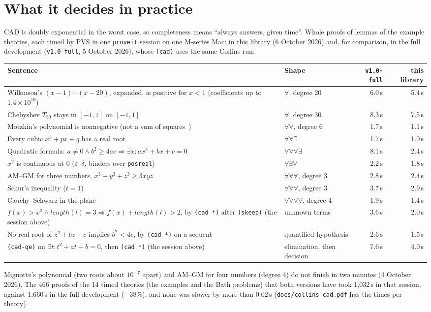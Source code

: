\documentclass[11pt]{article}
\begin{document}
\section{What it decides in practice}
CAD is doubly exponential in the worst case, so completeness means ``always answers, given time''. Whole proofs of
lemmas of the example theories, each timed by PVS in one \texttt{proveit} session on one M-series Mac: in this library
(6 October 2026) and, for comparison, in the full development (\texttt{v1.0-full}, 5 October 2026), whose
\texttt{(cad)} uses the same Collins run:
\begin{center}\small
\begin{tabularx}{\textwidth}{@{}X l r r@{}}
\toprule
Sentence & Shape & \texttt{v1.0-full} & this library\\
\midrule
Wilkinson's $(x-1)\cdots(x-20)$, expanded, is positive for $x<1$ (coefficients up to $1.4\times10^{19}$) & $\forall$, degree 20 & 6.0\,s & 5.4\,s\\
Chebyshev $T_{30}$ stays in $[-1,1]$ on $[-1,1]$ & $\forall$, degree 30 & 8.3\,s & 7.5\,s\\
Motzkin's polynomial is nonnegative (not a sum of squares~\cite{motzkin}) & $\forall\forall$, degree 6 & 1.7\,s & 1.1\,s\\
Every cubic $x^3+px+q$ has a real root & $\forall\forall\exists$ & 1.7\,s & 1.0\,s\\
Quadratic formula: $a\neq0 \wedge b^2\ge 4ac \Rightarrow \exists x\colon ax^2+bx+c=0$ & $\forall\forall\forall\exists$ & 8.1\,s & 2.4\,s\\
$x^2$ is continuous at 0 ($\varepsilon$--$\delta$, binders over \texttt{posreal}) & $\forall\exists\forall$ & 2.2\,s & 1.8\,s\\
AM--GM for three numbers, $x^3+y^3+z^3\ge 3xyz$ & $\forall\forall\forall$, degree 3 & 2.8\,s & 2.4\,s\\
Schur's inequality ($t=1$) & $\forall\forall\forall$, degree 3 & 3.7\,s & 2.9\,s\\
Cauchy--Schwarz in the plane & $\forall\forall\forall\forall$, degree 4 & 1.9\,s & 1.4\,s\\
$f(x) > x^2 \wedge \mathit{length}(l) = 3 \Rightarrow f(x) + \mathit{length}(l) > 2$, by \texttt{(cad *)} after \texttt{(skeep)} (the session above) & unknown terms & 3.6\,s & 2.0\,s\\
No real root of $z^2+bz+c$ implies $b^2<4c$, by \texttt{(cad *)} on a sequent & quantified hypothesis & 2.6\,s & 1.5\,s\\
\texttt{(cad-qe)} on $\exists t\colon t^2+at+b=0$, then \texttt{(cad *)} (the session above) & elimination, then decision & 7.6\,s & 4.0\,s\\
\bottomrule
\end{tabularx}
\end{center}
Mignotte's polynomial (two roots about $10^{-7}$ apart) and AM--GM for four numbers (degree 4) do not finish in two
minutes (4 October 2026). The 466 proofs of the 14 timed theories (the examples and the Bath problems) that both versions have took 1,032\,s in that
session, against 1,660\,s in the full development ($-38\%$), and none was slower by more than 0.02\,s
(\texttt{docs/collins\_cad.pdf} has the times per theory).
\end{document}
